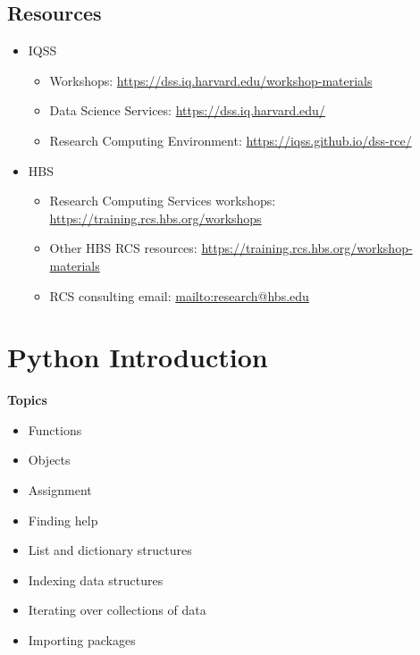 \documentclass[
]{book}
\providecommand{\tightlist}{%
  \setlength{\itemsep}{0pt}\setlength{\parskip}{0pt}}
\begin{document}
\hypertarget{resources-6}{%
\section{Resources}\label{resources-6}}

\begin{itemize}
\tightlist
\item
  IQSS

  \begin{itemize}
  \tightlist
  \item
    Workshops: \url{https://dss.iq.harvard.edu/workshop-materials}
  \item
    Data Science Services: \url{https://dss.iq.harvard.edu/}
  \item
    Research Computing Environment: \url{https://iqss.github.io/dss-rce/}
  \end{itemize}
\item
  HBS

  \begin{itemize}
  \tightlist
  \item
    Research Computing Services workshops: \url{https://training.rcs.hbs.org/workshops}
  \item
    Other HBS RCS resources: \url{https://training.rcs.hbs.org/workshop-materials}
  \item
    RCS consulting email: \url{mailto:research@hbs.edu}
  \end{itemize}
\end{itemize}

\hypertarget{python-introduction}{%
\chapter{Python Introduction}\label{python-introduction}}

\textbf{Topics}

\begin{itemize}
\tightlist
\item
  Functions
\item
  Objects
\item
  Assignment
\item
  Finding help
\item
  List and dictionary structures
\item
  Indexing data structures
\item
  Iterating over collections of data
\item
  Importing packages
\end{itemize}
\end{document}
